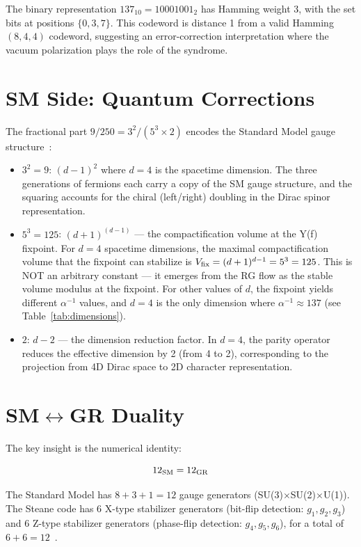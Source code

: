 \documentclass[12pt,a4paper]{article}
\begin{document}
The binary representation $137_{10} = 10001001_2$ has Hamming weight 3, with the set bits at positions $\{0, 3, 7\}$. This codeword is distance 1 from a valid Hamming$(8,4,4)$ codeword, suggesting an error-correction interpretation where the vacuum polarization plays the role of the syndrome.

\section{SM Side: Quantum Corrections}

The fractional part $9/250 = 3^2/(5^3 \times 2)$ encodes the Standard Model gauge structure~\cite{kapu-agents}:

\begin{itemize}
  \item $3^2 = 9$: $(d-1)^2$ where $d=4$ is the spacetime dimension. The three generations of fermions each carry a copy of the SM gauge structure, and the squaring accounts for the chiral (left/right) doubling in the Dirac spinor representation.
  \item $5^3 = 125$: $(d+1)^{(d-1)}$ — the compactification volume at the Y(f) fixpoint. For $d=4$ spacetime dimensions, the maximal compactification volume that the fixpoint can stabilize is $V_{\rm fix} = (d+1)^{d-1} = 5^3 = 125$. This is NOT an arbitrary constant — it emerges from the RG flow as the stable volume modulus at the fixpoint. For other values of $d$, the fixpoint yields different $\alpha^{-1}$ values, and $d=4$ is the only dimension where $\alpha^{-1} \approx 137$ (see Table~\ref{tab:dimensions}).
  \item $2$: $d-2$ — the dimension reduction factor. In $d=4$, the parity operator reduces the effective dimension by 2 (from 4 to 2), corresponding to the projection from 4D Dirac space to 2D character representation.
\end{itemize}

\section{SM$\leftrightarrow$GR Duality}

The key insight is the numerical identity:

\begin{equation}\label{eq:duality}
12_{\rm SM} = 12_{\rm GR}
\end{equation}

The Standard Model has $8 + 3 + 1 = 12$ gauge generators (SU(3)$\times$SU(2)$\times$U(1)). The Steane code has 6 X-type stabilizer generators (bit-flip detection: $g_1, g_2, g_3$) and 6 Z-type stabilizer generators (phase-flip detection: $g_4, g_5, g_6$), for a total of $6 + 6 = 12$~\cite{gondnok}.
\end{document}
